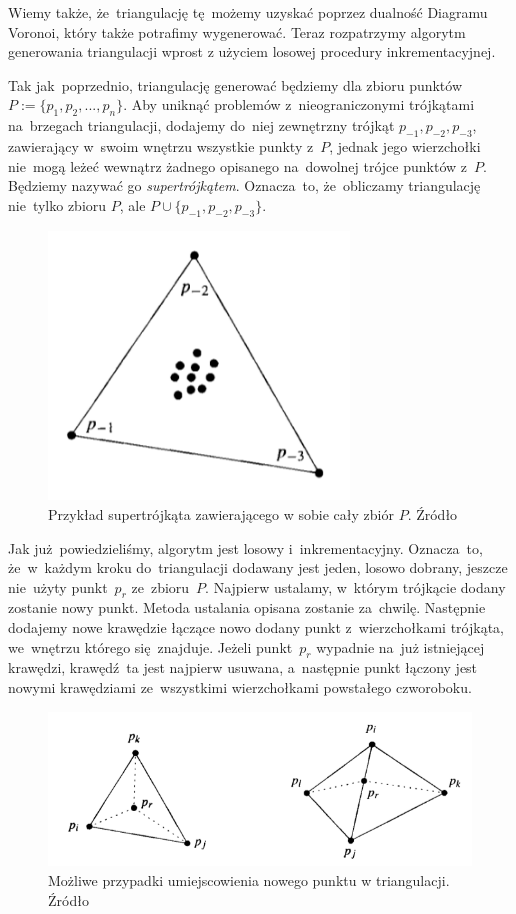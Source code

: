 \documentclass[skorowidz,autorrok,backref,xodstep,oswiadczenie]{wmimgr}
\begin{document}
Wiemy także, że~triangulację tę~możemy uzyskać poprzez dualność Diagramu Voronoi, który także potrafimy wygenerować. Teraz rozpatrzymy algorytm generowania triangulacji wprost z użyciem losowej procedury inkrementacyjnej.

Tak jak~poprzednio, triangulację generować będziemy dla zbioru punktów~$P:=\{ p_{1},p_{2},...,p_{n} \}$. Aby uniknąć problemów z~nieograniczonymi trójkątami na~brzegach triangulacji, dodajemy do~niej zewnętrzny trójkąt $p_{-1}, p_{-2}, p_{-3}$, zawierający w~swoim wnętrzu wszystkie punkty z~$P$, jednak jego wierzchołki nie~mogą leżeć wewnątrz żadnego opisanego na~dowolnej trójce punktów z~$P$. Będziemy nazywać go \emph{supertrójkątem}. Oznacza~to, że~obliczamy triangulację nie~tylko zbioru $P$, ale $P \cup \{p_{-1}, p_{-2}, p_{-3}\}$.


\begin{figure}[ht!]
\centering
\includegraphics[width=80mm]{images/triangulacja5.png}
\caption{Przykład supertrójkąta zawierającego w sobie cały zbiór $P$. Źródło \cite{geometria}}
\label{supertriangle}
\end{figure}

Jak już~powiedzieliśmy, algorytm jest losowy i~inkrementacyjny. Oznacza~to, że~w~każdym kroku do~triangulacji dodawany jest jeden, losowo dobrany, jeszcze nie~użyty punkt~$p_{r}$ ze~zbioru~$P$. Najpierw ustalamy, w~którym trójkącie dodany zostanie nowy punkt. Metoda ustalania opisana zostanie za~chwilę. Następnie dodajemy nowe krawędzie łączące nowo dodany punkt z~wierzchołkami trójkąta, we~wnętrzu którego się~znajduje. Jeżeli punkt~$p_{r}$ wypadnie na~już istniejącej krawędzi, krawędź~ta jest najpierw usuwana, a~następnie punkt łączony jest nowymi krawędziami ze~wszystkimi wierzchołkami powstałego czworoboku.

\begin{figure}[ht!]
\centering
\includegraphics[width=130mm]{images/triangulacja6.png}
\caption{Możliwe przypadki umiejscowienia nowego punktu w triangulacji. Źródło \cite{geometria}}
\label{newpointposition}
\end{figure}
\end{document}
